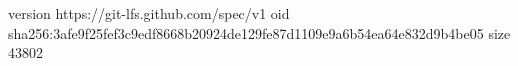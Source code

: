 version https://git-lfs.github.com/spec/v1
oid sha256:3afe9f25fef3c9edf8668b20924de129fe87d1109e9a6b54ea64e832d9b4be05
size 43802
